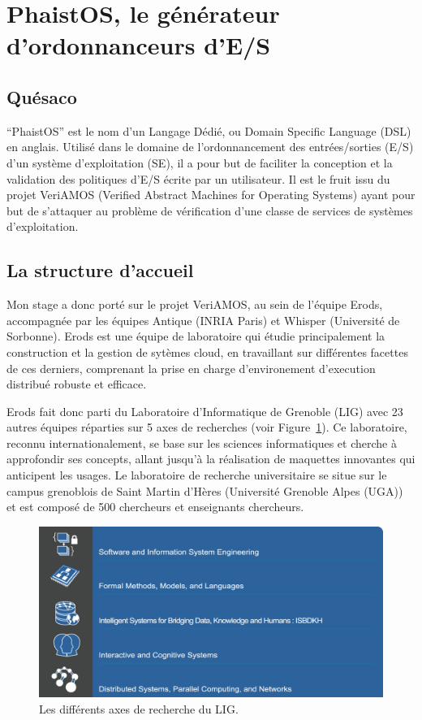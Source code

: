 \section{PhaistOS, le générateur d'ordonnanceurs d'E/S}
\label{intro}

\subsection{Quésaco}

``PhaistOS'' est le nom d'un Langage Dédié, ou Domain Specific Language (DSL) en anglais. Utilisé dans le domaine de l'ordonnancement des entrées/sorties (E/S) d'un système d'exploitation (SE), il a pour but de faciliter la conception et la validation des politiques d'E/S écrite par un utilisateur. Il est le fruit issu du projet VeriAMOS (Verified Abstract Machines for Operating Systems) ayant pour but de s'attaquer au problème de vérification d'une classe de services de systèmes d'exploitation.

\subsection{La structure d'accueil}

Mon stage a donc porté sur le projet VeriAMOS, au sein de l'équipe Erods, accompagnée par les équipes Antique (INRIA Paris) et Whisper (Université de Sorbonne). Erods est une équipe de laboratoire qui étudie principalement la construction et la gestion de sytèmes cloud, en travaillant sur différentes facettes de ces derniers, comprenant la prise en charge d'environement d'execution distribué robuste et efficace. 

Erods fait donc parti du Laboratoire d'Informatique de Grenoble (LIG) avec 23 autres équipes réparties sur 5 axes de recherches (voir Figure~\ref{fig:lig}). Ce laboratoire, reconnu internationalement, se base sur les sciences informatiques et cherche à approfondir ses concepts, allant jusqu'à la réalisation de maquettes innovantes qui anticipent les usages. Le laboratoire de recherche universitaire se situe sur le campus grenoblois de Saint Martin d'Hères (Université Grenoble Alpes (UGA)) et est composé de 500 chercheurs et enseignants chercheurs.

\begin{figure}[h!t] \centering
    \includegraphics[width=12.5cm]{images/axeslig}
    \caption{Les différents axes de recherche du LIG.}
    \label{fig:lig}
\end{figure}

